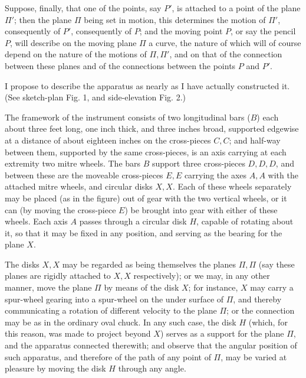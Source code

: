 \documentclass[11pt,a4paper]{article}
\begin{document}
Suppose, finally, that one of the points, say $P'$, is attached to a point of the plane
$\Pi'$; then the plane $\Pi$ being set in motion, this determines the motion of $\Pi'$,
consequently of $P'$, consequently of $P$; and the moving point $P$, or say the pencil $P$,
will describe on the moving plane $\Pi$ a curve, the nature of which will of course depend
on the nature of the motions of $\Pi,\Pi'$, and on that of the connection between these
planes and of the connections between the points $P$ and $P'$.

I propose to describe the apparatus as nearly as I have actually constructed it. (See
sketch-plan Fig. 1, and side-elevation Fig. 2.)

The framework of the instrument consists of two longitudinal bars ($B$) each about three
feet long, one inch thick, and three inches broad, supported edgewise at a distance of about
eighteen inches on the cross-pieces $C,C$; and half-way between them, supported by the same
cross-pieces, is an axis carrying at each extremity two mitre wheels. The bars $B$ support
three cross-pieces $D,D,D$, and between these are the moveable cross-pieces $E,E$ carrying
the axes $A,A$ with the attached mitre wheels, and circular disks $X,X$. Each of these
wheels separately may be placed (as in the figure) out of gear with the two vertical wheels,
or it can (by moving the cross-piece $E$) be brought into gear with either of these wheels.
Each axis $A$ passes through a circular disk $H$, capable of rotating about it, so that it may
be fixed in any position, and serving as the bearing for the plane $X$.

\begin{center}
\end{center}

The disks $X,X$ may be regarded as being themselves the planes $\Pi,\Pi$ (say these planes
are rigidly attached to $X,X$ respectively); or we may, in any other manner, move the plane
$\Pi$ by means of the disk $X$; for instance, $X$ may carry a spur-wheel gearing into a
spur-wheel on the under surface of $\Pi$, and thereby communicating a rotation of different
velocity to the plane $\Pi$; or the connection may be as in the ordinary oval chuck. In any
such case, the disk $H$ (which, for this reason, was made to project beyond $X$) serves as
a support for the plane $\Pi$, and the apparatus connected therewith; and observe that the
angular position of such apparatus, and therefore of the path of any point of $\Pi$, may be
varied at pleasure by moving the disk $H$ through any angle.
\end{document}
